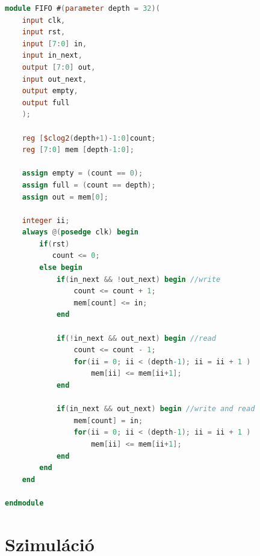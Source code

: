 \begin{lstlisting}[frame=single,language=verilog,caption={FIFO verilog modul},captionpos=b,label={lst:fifo}]
module FIFO #(parameter depth = 32)(
    input clk,
    input rst,
    input [7:0] in,
    input in_next,
    output [7:0] out,
    input out_next,
    output empty,
    output full
    );
    
    reg [$clog2(depth+1)-1:0]count;
    reg [7:0] mem [depth-1:0];
    
    assign empty = (count == 0);
    assign full = (count == depth);
    assign out = mem[0];
    
    integer ii;
    always @(posedge clk) begin
        if(rst)
           count <= 0;
        else begin            
            if(in_next && !out_next) begin //write
                count <= count + 1;
                mem[count] <= in;
            end
            
            if(!in_next && out_next) begin //read
                count <= count - 1;
                for(ii = 0; ii < (depth-1); ii = ii + 1 )
                    mem[ii] <= mem[ii+1];
            end
            
            if(in_next && out_next) begin //write and read
                mem[count] = in;                
                for(ii = 0; ii < (depth-1); ii = ii + 1 )
                    mem[ii] <= mem[ii+1];
            end
        end
    end
    
endmodule
\end{lstlisting}
\section{Szimuláció}


